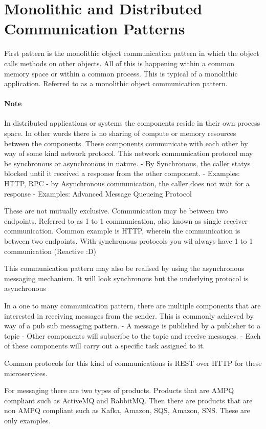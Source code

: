 \section{Monolithic and Distributed Communication Patterns}
First pattern is the monolithic object communication pattern in which the object calls methods on other objects.
All of this is happening within a common memory space or within a common process.
This is typical of a monolithic application.
Referred to as a monolithic object communication pattern.

\paragraph{Note}
In distributed applications or systems the components reside in their own process space.
In other words there is no sharing of compute or memory resources between the components.
These components communicate with each other by way of some kind network protocol.
This network communication protocol may be synchronous or asynchronous in nature.
- By Synchronous, the caller statys blocked until it received a response from the other component.
- Examples: HTTP, RPC
- by Asynchronous communication, the caller does not wait for a response
- Examples: Advanced Message Queueing Protocol

These are not mutually exclusive.
Communication may be between two endpoints.
Referred to as 1 to 1 communication, also known as single receiver communication.
Common example is HTTP, wherein the communication is between two endpoints.
With synchronous protocols you wil always have 1 to 1 communication (Reactive :D)

This communication pattern may also be realised by using the asynchronous messaging mechanism.
It will look synchronous but the underlying protocol is asynchronous

In a one to many communication pattern, there are multiple components that are interested in receiving messages from the sender.
This is commonly achieved by way of a pub sub messaging pattern.
- A message is published by a publisher to a topic
- Other components will subscribe to the topic and receive messages.
- Each of these components will carry out a specific task assigned to it.

Common protocols for this kind of communications is REST over HTTP for these microservices.

For messaging there are two types of products. Products that are AMPQ compliant such as ActiveMQ and RabbitMQ.
Then there are products that are non AMPQ compliant such as Kafka, Amazon, SQS, Amazon, SNS. These are only examples.

